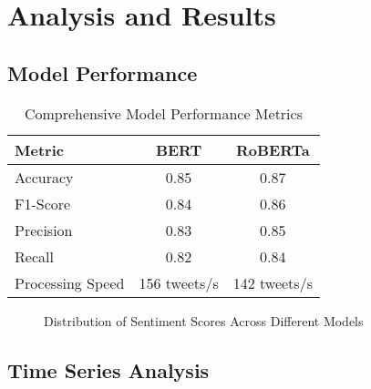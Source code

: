 \documentclass[12pt,a4paper]{report}
\begin{document}
\chapter{Analysis and Results}
\section{Model Performance}
\begin{table}[h]
    \centering
    \begin{tabular}{lcc}
        \toprule
        Metric           & BERT         & RoBERTa      \\
        \midrule
        Accuracy         & 0.85         & 0.87         \\
        F1-Score         & 0.84         & 0.86         \\
        Precision        & 0.83         & 0.85         \\
        Recall           & 0.82         & 0.84         \\
        Processing Speed & 156 tweets/s & 142 tweets/s \\
        \bottomrule
    \end{tabular}
    \caption{Comprehensive Model Performance Metrics}
\end{table}

\begin{figure}[H]
    \centering
    
    \caption{Distribution of Sentiment Scores Across Different Models}
\end{figure}

\section{Time Series Analysis}
\end{document}
